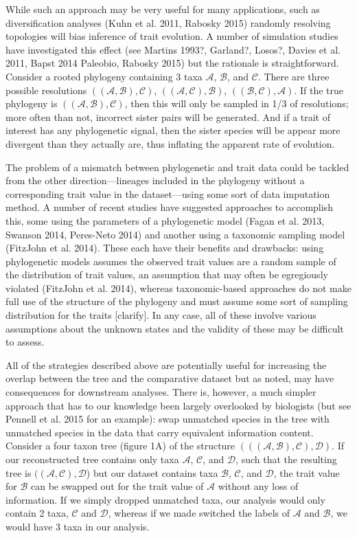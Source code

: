 \documentclass[a4paper,11pt]{article}
\begin{document}
While such an approach may be very useful for many applications, such as diversification analyses (Kuhn et al. 2011, Rabosky 2015) randomly resolving topologies will bias inference of trait evolution. A number of simulation studies have investigated this effect (see Martins 1993?, Garland?, Losos?, Davies et al. 2011, Bapst 2014 Paleobio, Rabosky 2015) but the rationale is straightforward. Consider a rooted phylogeny containing 3 taxa $\mathcal{A}$, $\mathcal{B}$, and $\mathcal{C}$. There are three possible resolutions $((\mathcal{A},\mathcal{B}),\mathcal{C})$, $((\mathcal{A},\mathcal{C}),\mathcal{B})$, $((\mathcal{B},\mathcal{C}),\mathcal{A})$. If the true phylogeny is $((\mathcal{A},\mathcal{B}),\mathcal{C})$, then this will only be sampled in 1/3 of resolutions; more often than not, incorrect sister pairs will be generated. And if a trait of interest has any phylogenetic signal, then the sister species will be appear more divergent than they actually are, thus inflating the apparent rate of evolution.

The problem of a mismatch between phylogenetic and trait data could be tackled from the other direction---lineages included in the phylogeny without a corresponding trait value in the dataset---using some sort of data imputation method. A number of recent studies have suggested approaches to accomplish this, some using the parameters of a phylogenetic model (Fagan et al. 2013, Swanson 2014, Peres-Neto 2014) and another using a taxonomic sampling model (FitzJohn et al. 2014). These each have their benefits and drawbacks: using phylogenetic models assumes the observed trait values are a random sample of the distribution of trait values, an assumption that may often be egregiously violated (FitzJohn et al. 2014), whereas taxonomic-based approaches do not make full use of the structure of the phylogeny and must assume some sort of sampling distribution for the traits [clarify]. In any case, all of these involve various assumptions about the unknown states and the validity of these may be difficult to assess.

All of the strategies described above are potentially useful for increasing the overlap between the tree and the comparative dataset but as noted, may have consequences for downstream analyses. There is, however, a much simpler approach that has to our knowledge been largely overlooked by biologists (but see Pennell et al. 2015 for an example): swap unmatched species in the tree with unmatched species in the data that carry equivalent information content. Consider a four taxon tree (figure 1A) of the structure $(((\mathcal{A},\mathcal{B}),\mathcal{C}),\mathcal{D})$. If our reconstructed tree contains only taxa $\mathcal{A}$, $\mathcal{C}$, and $\mathcal{D}$, such that the resulting tree is $((\mathcal{A},\mathcal{C}),\mathcal{D}$) but our dataset contains taxa $\mathcal{B}$, $\mathcal{C}$, and $\mathcal{D}$, the trait value for $\mathcal{B}$ can be swapped out for the trait value of $\mathcal{A}$ without any loss of information. If we simply dropped unmatched taxa, our analysis would only contain 2 taxa, $\mathcal{C}$ and $\mathcal{D}$, whereas if we made switched the labels of $\mathcal{A}$ and $\mathcal{B}$, we would have 3 taxa in our analysis.
\end{document}
